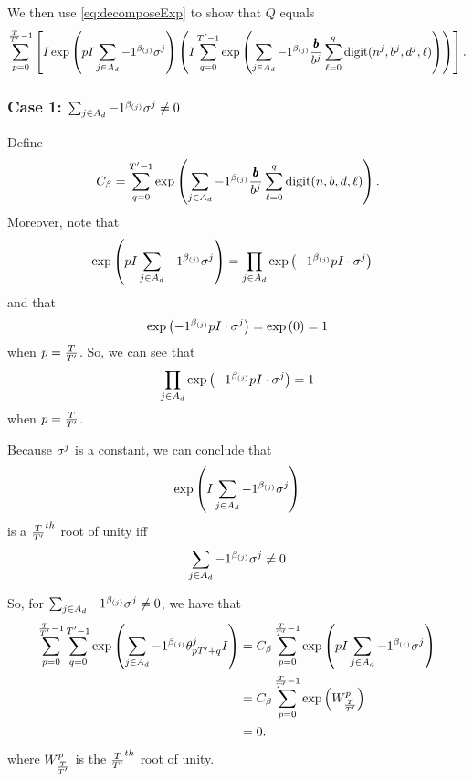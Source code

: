 
We then use \eqref{eq:decomposeExp} to show that $Q$ equals
\begin{equation}
\label{eq:inner-outer-split}
  \sum_{p= 0}^{\frac{T}{{T}'} - 1} \left[
    I \exp\left(
      pI \sum_{j \in A_d} -1 ^ {\beta_{(j)}}
      \sigma^j
    \right)
  \left(
  I \sum_{q = 0}^{{T}' - 1}
    \exp\left(
        \sum_{j \in A_d} -1 ^ {\beta_{(j)}} \frac{{\pmb{b}}}{b^j}
          \sum_{\ell = 0}^{q}\mathrm{digit}(n^j, b^j, d^j, \ell)
    \right)\right)\right].
\end{equation}

\subsubsection*{Case 1: $\sum_{j \in A_d} -1 ^ {\beta_{(j)}} \sigma^j \neq 0$}
Define
$$
  C_\beta = \sum_{q = 0}^{{T}' - 1}
  \exp\left(
      \sum_{j \in A_d} -1 ^ {\beta_{(j)}} \frac{{\pmb{b}}}{b^j}
        \sum_{\ell = 0}^{q}\mathrm{digit}(n, b, d, \ell)
  \right).
$$
Moreover, note that 
\begin{align*}
  &\exp\left(
      pI \sum_{j \in A_d} -1 ^ {\beta_{(j)}}
      \sigma^j
    \right)
  = \prod_{j \in A_d} \exp\left(-1^{\beta_{(j)}} pI \cdot \sigma^j \right)
\end{align*}
and that 
\begin{equation*}
  \exp\left(-1^{\beta_{(j)}} pI \cdot \sigma^j \right) = \exp\left(0\right) = 1
\end{equation*}
when $p = \frac{T}{{T}'}$. So, we can see that
$$
\prod_{j \in A_d} \exp\left(-1^{\beta_{(j)}} pI \cdot \sigma^j \right) = 1
$$
when $p = \frac{T}{{T}'}$.

Because $\sigma^j$ is a constant, we can conclude that
\begin{equation*}
 \exp\left(
      I \sum_{j \in A_d} -1 ^ {\beta_{(j)}}
      \sigma^j
    \right) 
\end{equation*}
is a $\frac{T}{{T}'}^{th}$ root of unity iff 
$$\sum_{j \in A_d} -1 ^ {\beta_{(j)}}\sigma^j \neq 0$$

So, for $\sum_{j \in A_d} -1 ^ {\beta_{(j)}}\sigma^j \neq 0$, we have that
\begin{align*}
  \sum_{p= 0}^{\frac{T}{{T}'} - 1} \sum_{q = 0}^{{T}' - 1} \exp\left( \sum_{j \in A_d} -1 ^ {\beta_{(j)}} {\theta^j_{p {T}' + q}}I \right) &= C_\beta \sum_{p= 0}^{\frac{T}{{T}'} - 1}
    \exp\left(
      pI \sum_{j \in A_d} -1 ^ {\beta_{(j)}}
      \sigma^j
    \right) \\
    &= C_\beta \sum_{p = 0}^{\frac{T}{{T}'} - 1}\exp\left(W_{\frac{T}{{T}'}}^p\right) \\
    &= 0.
\end{align*}
where $W_{\frac{T}{{T}'}}^p$ is the $\frac{T}{{T}'}^{th}$ root of unity.


